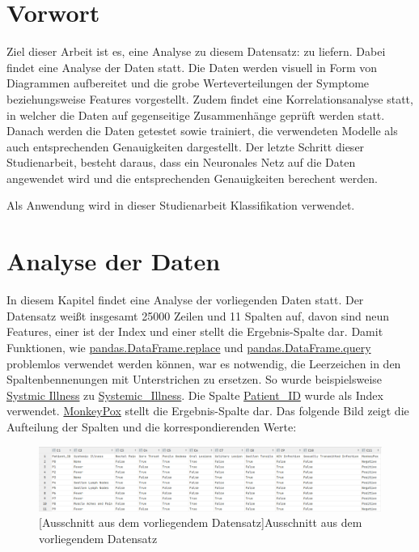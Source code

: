 \documentclass[13pt,a4paper, listof=entryprefix, bibliography=totocnumbered,toc=listofnumbered,lof=listofnumbered]{scrartcl}
\begin{document}

	\section{Vorwort}
		\label{ch:vorwort}

	Ziel dieser Arbeit ist es, eine Analyse zu diesem Datensatz:  zu liefern. Dabei findet eine Analyse der 
	Daten statt. Die Daten werden visuell in Form von Diagrammen aufbereitet und die grobe Werteverteilungen
	der Symptome beziehungsweise Features vorgestellt. Zudem findet eine Korrelationsanalyse statt, in welcher die 
	Daten auf gegenseitige Zusammenhänge geprüft werden statt. Danach werden die Daten getestet sowie trainiert, die
	verwendeten Modelle als auch entsprechenden Genauigkeiten dargestellt. Der letzte Schritt dieser Studienarbeit,
	besteht daraus, dass ein Neuronales Netz auf die Daten angewendet wird und die entsprechenden Genauigkeiten
	berechent werden. 

	Als Anwendung wird in dieser Studienarbeit Klassifikation verwendet. 
	

	\section{Analyse der Daten}
		\label{ch:analyse_daten}

	In diesem Kapitel findet eine Analyse der vorliegenden Daten statt. Der Datensatz weißt insgesamt 25000 Zeilen und 11 Spalten auf, davon sind 
	neun Features, einer ist der Index und einer stellt die Ergebnis-Spalte dar. Damit Funktionen, wie \url{pandas.DataFrame.replace} und 
	\url{pandas.DataFrame.query} problemlos verwendet werden können, war es notwendig, die Leerzeichen in den Spaltenbennenungen mit Unterstrichen zu ersetzen. 
	So wurde beispielsweise \url{Systmic Illness} zu \url{Systemic_Illness}.  Die Spalte \url{Patient_ID} wurde als Index verwendet. 
	\url{MonkeyPox} stellt die Ergebnis-Spalte dar. Das folgende Bild zeigt die Aufteilung der Spalten und die korrespondierenden Werte:

	\begin{figure}[H]
		\centering
		\includegraphics[width=0.8\linewidth]{Bilder/data_table.png}
		[Ausschnitt aus dem vorliegendem Datensatz]{Ausschnitt aus dem vorliegendem Datensatz}
		\label{fig:data_table}
	\end{figure}
\end{document}
